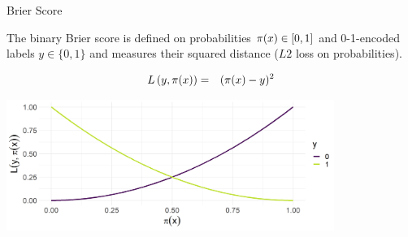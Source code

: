 



\begin{vbframe}{Brier Score}

The binary Brier score is defined on probabilities $\pi(x) \in [0, 1]$ and 0-1-encoded labels $y \in \{0, 1\}$ and measures their squared distance ($L2$ loss on probabilities).

\begin{eqnarray*}
L\left(y, \pi(x)\right) &=& (\pi(x) - y)^2
\end{eqnarray*}

\vspace{0.2cm}
\begin{center}
\includegraphics[width = 0.8\textwidth]{figure/plot_brier.png}
\end{center}


\end{vbframe}

